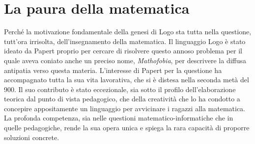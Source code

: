 \chapter{La paura della matematica} \label{cap:papert}

Perché la motivazione fondamentale della genesi di Logo sta tutta nella questione, tutt'ora irrisolta, dell'insegnamento della matematica. Il linguaggio Logo è stato ideato da Papert proprio per cercare di risolvere questo annoso problema per il quale aveva coniato anche un preciso nome, \textit{Mathofobia}, per descrivere la diffusa antipatia verso questa materia. L'interesse di Papert per la questione ha accompagnato tutta la sua vita lavorativa, che si è distesa nella seconda metà del 900. Il suo contributo è stato eccezionale, sia sotto il profilo dell'elaborazione teorica dal punto di vista pedagogico, che della creatività che lo ha condotto a concepire appositamente un linguaggio per avvicinare i ragazzi alla matematica. La profonda competenza, sia nelle questioni matematico-informatiche che in quelle pedagogiche, rende la sua opera unica e spiega la rara capacità di proporre soluzioni concrete. 

